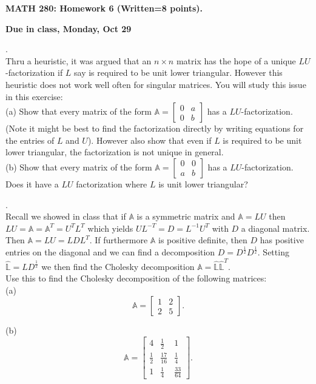 \documentclass[12 pt]{article}
\begin{document}
\centerline{\bf MATH 280: Homework 6 (Written=8 points). }
\centerline{\bf Due in class, Monday, Oct 29}

\bigskip

. \\ Thru a heuristic, it was argued that an $n \times n$ matrix has the hope of a unique $LU$-factorization if $L$ say is required 
to be unit lower triangular. However this heuristic does not work well often for singular matrices. You will study this issue in this exercise: \\
(a) Show that every matrix of the form $\mathbb{A}=\begin{bmatrix} 0 & a \\ 0 & b \end{bmatrix}$ has a $LU$-factorization. (Note it might be best to find the factorization directly by writing equations for the entries of $L$ and $U$). However also 
show that even if $L$ is required to be unit lower triangular, the factorization is not unique in general. \\
(b) Show that every matrix of the form $\mathbb{A}=\begin{bmatrix} 0 & 0 \\ a & b \end{bmatrix}$ has a $LU$-factorization. Does it have a $LU$ factorization 
where $L$ is unit lower triangular?

\vspace{0.2 in}

. \\ Recall we showed in class that if $\mathbb{A}$ is a symmetric matrix and $\mathbb{A}=LU$ then $LU=\mathbb{A}=\mathbb{A}^T=U^TL^T$ which yields $UL^{-T}=D=L^{-1}U^T$
with $D$ a diagonal matrix. Then $\mathbb{A}=LU=LDL^T$. If furthermore $\mathbb{A}$ is positive definite, then $D$ has positive entries on the diagonal and we can 
find a decomposition $D=D^{\frac{1}{2}} D^{\frac{1}{2}}$. Setting $\mathbb{\hat{L}}=LD^{\frac{1}{2}}$ we then find the Cholesky decomposition 
$\mathbb{A}=\hat{\mathbb{L}}\hat{\mathbb{L}}^T$. \\
Use this to find the Cholesky decomposition of the following matrices: \\
(a)
$$
\mathbb{A}=\begin{bmatrix} 1 & 2 \\ 2 & 5 \end{bmatrix}.
$$

\noindent
(b)
$$
\mathbb{A}=\begin{bmatrix} 4 & \frac{1}{2} & 1 \\ \frac{1}{2} & \frac{17}{16} & \frac{1}{4} \\  1 & \frac{1}{4} & \frac{33}{64} \end{bmatrix}.
$$
\end{document}

